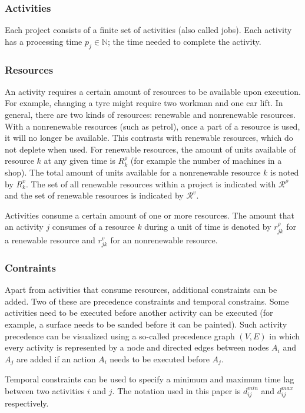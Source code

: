 \documentclass{article}
\begin{document}
\subsubsection{Activities}
Each project consists of a finite set of activities (also called jobs). Each activity has a processing time $p_{j} \in \mathbb{N}$; the time needed to complete the activity.

\subsubsection{Resources}
An activity requires a certain amount of resources to be available upon execution. For example, changing a tyre might require two workman and one car lift. In general, there are two kinds of resources: renewable and nonrenewable resources. With a nonrenewable resources (such as petrol), once a part of a resource is used, it will no longer be available. This contrasts with renewable resources, which do not deplete when used. For renewable resources, the amount of units available of resource $k$ at any given time is $R^{\rho}_k$ (for example the number of machines in a shop). The total amount of units available for a nonrenewable resource $k$ is noted by $R^{v}_k$. The set of all renewable resources within a project is indicated with $\mathcal{R}^{\rho}$ and the set of renewable resources is indicated by $\mathcal{R}^{v}$. 

Activities consume a certain amount of one or more resources. The amount that an activity $j$ consumes of a resource $k$ during a unit of time is denoted by $r^{\rho}_{jk}$ for a renewable resource and  $r^{v}_{jk}$ for an nonrenewable resource. 

\subsubsection{Contraints}
Apart from activities that consume resources, additional constraints can be added. Two of these are precedence constraints and temporal constrains. Some activities need to be executed before another activity can be executed (for example, a surface needs to be sanded before it can be painted). Such activity precedence can be visualized using a so-called precedence graph $(V, E)$ in which every activity is represented by a node and directed edges between nodes $A_i$ and $A_j$ are added if an action $A_i$ needs to be executed before $A_j$.

Temporal constraints can be used to specify a minimum and maximum time lag between two activities $i$ and $j$. The notation used in this paper is $d^{min}_{ij}$ and $d^{max}_{ij}$ respectively.
\end{document}
